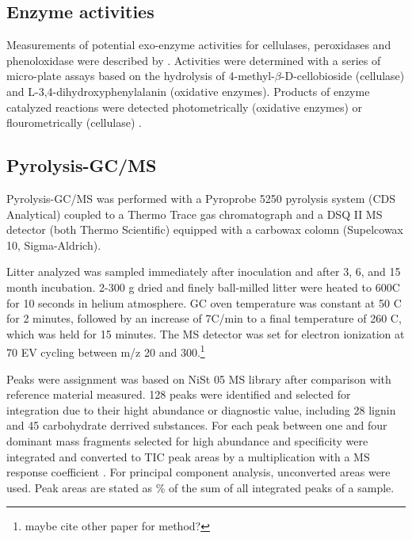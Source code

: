 \documentclass[authoryear,preprint,review,12pt]{elsarticle}
\begin{document}
\subsection{Enzyme activities}

Measurements of potential exo-enzyme activities for cellulases, peroxidases and phenoloxidase were described by \cite{Leitner2011}. Activities were determined with a series of micro-plate assays based on the hydrolysis of 4-methyl-$\beta$-D-cellobioside (cellulase) and L-3,4-di\-hydroxy\-phenyl\-alanin (oxidative enzymes). Products of enzyme catalyzed reactions were detected photometrically (oxidative enzymes) or flourometrically (cellulase) \citep{Marx2001, Sinsabaugh1999, Kaiser2010b}.

\subsection{Pyrolysis-GC/MS}
Pyrolysis-GC/MS was performed with a Pyroprobe 5250 pyrolysis system (CDS Analytical) coupled to a Thermo Trace gas chromatograph and a DSQ II MS detector (both Thermo Scientific) equipped with a carbowax colomn (Supelcowax 10, Sigma-Aldrich).

Litter analyzed was sampled immediately after inoculation and after 3, 6, and 15 month incubation. 2-300 \textmu g dried and finely ball-milled litter were heated to 600\textdegree C for 10 seconds in helium atmosphere. GC oven temperature was constant at 50 \textdegree C for 2 minutes, followed by an increase of 7\textdegree C/min to a final temperature of 260 \textdegree C, which was held for 15 minutes. The MS detector was set for electron ionization at 70 EV cycling between m/z 20 and 300.\footnote{maybe cite other paper for method?}

Peaks were assignment was based on NiSt 05 MS library after comparison with reference material measured. 128 peaks were identified and selected for integration due to their hight abundance or diagnostic value, including 28 lignin and 45 carbohydrate derrived substances. For each peak between one and four dominant mass fragments selected for high abundance and specificity were integrated and converted to TIC peak areas by a multiplication with a MS response coefficient \citep{Schellekens2009, Kuder1998}. For principal component analysis, unconverted areas were used. Peak areas are stated as \% of the sum of all integrated peaks of a sample.

\end{document}
